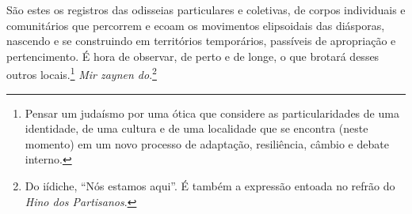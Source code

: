 
São estes os registros das odisseias particulares e coletivas, de corpos individuais e comunitários que percorrem e ecoam os movimentos elipsoidais das diásporas, nascendo e se construindo em territórios temporários, passíveis de apropriação e pertencimento. É hora de observar, de perto e de longe, o que brotará desses outros locais.\footnote{Pensar um judaísmo por uma ótica que considere as particularidades de uma identidade, de uma cultura e de uma localidade que se encontra (neste momento) em um novo processo de adaptação, resiliência, câmbio e debate interno.} \emph{Mir zaynen do}.\footnote{Do iídiche, ``Nós estamos aqui''. É também a expressão entoada no refrão do \emph{Hino dos Partisanos}.}





